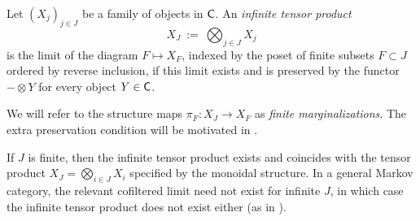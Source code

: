 \documentclass[11pt]{article}
\begin{document}
\begin{definition}
	\label{semicartesian_infproduct}
	Let $(X_j)_{j \in J}$ be a family of objects in $\mathsf{C}$. An \emph{infinite tensor product}
	\[
		X_J \: := \: \bigotimes_{j \in J} X_j
	\]
	is the limit of the diagram $F \mapsto X_F$, indexed by the poset of finite subsets $F \subset J$ ordered by reverse inclusion, if this limit exists and is preserved by the functor $- \otimes Y$ for every object $Y \in \mathsf{C}$.
\end{definition}

We will refer to the structure maps $\pi_F : X_J \to X_F$ as \emph{finite marginalizations}. The extra preservation condition will be motivated in .

\begin{remark}
	If $J$ is finite, then the infinite tensor product exists and coincides with the tensor product $X_J = \bigotimes_{i \in J} X_i$ specified by the monoidal structure. In a general Markov category, the relevant cofiltered limit need not exist for infinite $J$, in which case the infinite tensor product does not exist either (as in ).
\end{remark}
\end{document}
